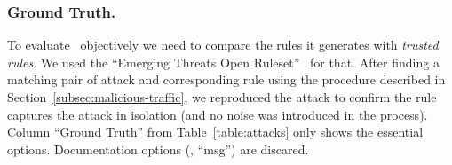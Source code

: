 \documentclass[sigconf,review, anonymous]{acmart}
\begin{document}

\subsubsection{Ground Truth.}To evaluate \tname\ objectively we need
to compare the rules it generates with \emph{trusted rules}. We used
the ``Emerging Threats Open Ruleset''~\cite{emerging-threats-open} for
that. After finding a matching pair of attack and corresponding rule
using the procedure described in
Section~\ref{subsec:malicious-traffic}, we reproduced the attack to
confirm the rule captures the attack in isolation (and no noise was
introduced in the process). Column ``Ground Truth'' from
Table~\ref{table:attacks} only shows the essential
options. Documentation options (\eg{}, ``msg'') are discared.






\end{document}
